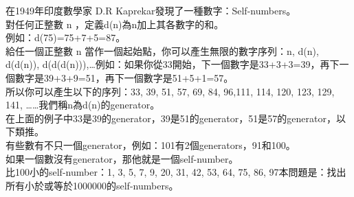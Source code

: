 在1949年印度數學家 D.R Kaprekar發現了一種數字：Self-numbers。\\
對任何正整數 n ，定義d(n)為n加上其各數字的和。\\
例如：d(75)=75+7+5=87。\\
給任一個正整數 n 當作一個起始點，你可以產生無限的數字序列：n, d(n), d(d(n)), d(d(d(n))),…例如：如果你從33開始，下一個數字是33+3+3=39，再下一個數字是39+3+9=51，再下一個數字是51+5+1=57。\\
所以你可以產生以下的序列：33, 39, 51, 57, 69, 84, 96,111, 114, 120, 123, 129, 141, ……我們稱n為d(n)的generator。\\
在上面的例子中33是39的generator，39是51的generator，51是57的generator，以下類推。\\
有些數有不只一個generator，例如：101有2個generators，91和100。\\
如果一個數沒有generator，那他就是一個self-number。\\
比100小的self-number：1, 3, 5, 7, 9, 20, 31, 42, 53, 64, 75, 86, 97本問題是：找出所有小於或等於1000000的self-numbers。\\
